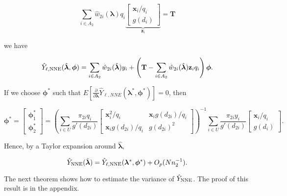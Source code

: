 \documentclass[12pt]{article}
\renewcommand{\bf}[1]{\mathbf{#1}}
\begin{document}
\begin{equation}
  \sum_{i \in A_2} \hat w_{2i}(\bm \lambda) q_i
  \underbrace{
  \begin{bmatrix} 
    \bf x_i / q_i \\ g(d_i)
\end{bmatrix}}_{\bf z_i} = \bf T
\end{equation}

we have 

$$\hat Y_{\ell, \rm NNE} (\hat{\bm \lambda}, \bm \phi) = \sum_{i \in A_2} \hat
w_{2i}(\hat{\bm \lambda})y_i + \left(\bf T - \sum_{i \in A_2} \hat
w_{2i}(\hat{\bm \lambda}) \bf z_i q_i\right) \bm \phi.$$

If we choose $\bm \phi^*$ such that $E\left[\frac{\partial}{\partial \bm \lambda} 
  \hat Y_{\ell, NNE}(\bm \lambda^*, \bm \phi^*)\right] = 0$, then

$$\bm \phi^* =
\begin{bmatrix}
  \bm \phi^*_1 \\ \bm \phi^*_2
\end{bmatrix} = 
\left(\sum_{i \in U} \frac{\pi_{2i} q_i}{g'(d_{2i})} 
\begin{bmatrix}
  \bf x_i^2 / q_i & \bf x_i g(d_{2i}) / q_i \\
  \bf x_i g(d_{2i}) / q_i & g(d_{2i})^2
\end{bmatrix}
\right)^{-1}
\sum_{i \in U} \frac{\pi_{2i} y_i}{g'(d_{2i})} 
\begin{bmatrix} \bf x_i / q_i \\ g(d_i) \end{bmatrix}.
$$

Hence, by a Taylor expansion around $\hat{\bm \lambda}$,

$$\hat Y_{\rm NNE}(\hat{\bm \lambda}) = \hat Y_{\ell, \rm NNE}(\bm \lambda^*, 
\bm \phi^*) + O_p(Nn_2^{-1}).$$

The next theorem shows how to estimate the variance of $\hat Y_{\rm NNE}$.
The proof of this result is in the appendix.
\end{document}
